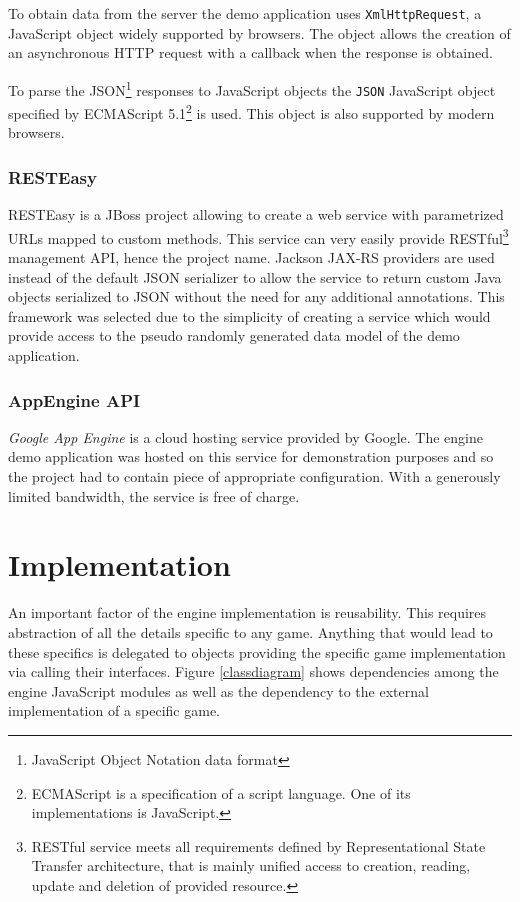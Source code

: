 \documentclass[11pt,oneside, final]{fithesis2}
\begin{document}
To obtain data from the server the demo application uses \texttt{XmlHttpRequest}, a JavaScript object widely supported by browsers\cite{xhr}. The object allows the creation of an asynchronous HTTP request with a callback when the response is obtained.

To parse the JSON\footnote{JavaScript Object Notation data format} responses to JavaScript objects the \texttt{JSON} JavaScript object specified by ECMAScript 5.1\footnote{ECMAScript is a specification of a script language. One of its implementations is JavaScript\cite{ecma}.} is used. This object is also supported by modern browsers\cite{json}.

\subsection{RESTEasy}
RESTEasy is a JBoss project allowing to create a web service with parametrized URLs mapped to custom methods\cite{resteasy}. This service can very easily  provide RESTful\footnote{RESTful service meets all requirements defined by Representational State Transfer architecture, that is mainly unified access to creation, reading, update and deletion of provided resource\cite{fielding}.} management API, hence the project name. Jackson JAX-RS providers\cite{jackson} are used instead of the default JSON serializer to allow the service to return custom Java objects serialized to JSON without the need for any additional annotations. This framework was selected due to the simplicity of creating a service which would provide access to the pseudo randomly generated data model of the demo application.

\subsection{AppEngine API}
\emph{Google App Engine} is a cloud hosting service provided by Google. The engine demo application was hosted on this service for demonstration purposes and so the project had to contain piece of appropriate configuration. With a generously limited bandwidth, the service is free of charge. \cite{appengine}

\chapter{Implementation}
\label{implementation}
An important factor of the engine implementation is reusability. This requires abstraction of all the details specific to any game. Anything that would lead to these specifics is delegated to objects providing the specific game implementation via calling their interfaces. Figure \ref{classdiagram} shows dependencies among the engine JavaScript modules as well as the dependency to the external implementation of a specific game.
\end{document}

